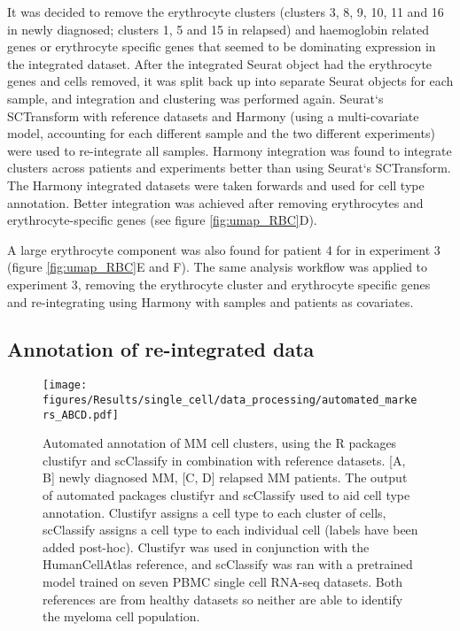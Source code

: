 It was decided to remove the erythrocyte clusters (clusters 3, 8, 9, 10, 11 and 16 in newly diagnosed; clusters 1, 5 and 15 in relapsed) and haemoglobin related genes or erythrocyte specific genes that seemed to be dominating expression in the integrated dataset.
After the integrated Seurat object had the erythrocyte genes and cells removed, it was split back up into separate Seurat objects for each sample, and integration and clustering was performed again.
Seurat`s SCTransform with reference datasets and Harmony (using a multi-covariate model, accounting for each different sample and the two different experiments) were used to re-integrate all samples.
Harmony integration was found to integrate clusters across patients and experiments better than using Seurat`s SCTransform.
The Harmony integrated datasets were taken forwards and used for cell type annotation.
Better integration was achieved after removing erythrocytes and erythrocyte-specific genes (see figure \ref{fig:umap_RBC}D).

A large erythrocyte component was also found for patient 4 for in experiment 3 (figure \ref{fig:umap_RBC}E and F).
The same analysis workflow was applied to experiment 3, removing the erythrocyte cluster and erythrocyte specific genes and re-integrating using Harmony with samples and patients as covariates.



\subsection{Annotation of re-integrated data}


\begin{figure}[htb]
    \centering
    \texttt{[image: figures/Results/single\_cell/data\_processing/automated\_markers\_ABCD.pdf]}
    \caption[Automated annotation of scRNA-seq data]{Automated annotation of MM cell clusters, using the R packages clustifyr and scClassify in combination with reference datasets.
    [A, B] newly diagnosed MM, [C, D] relapsed MM patients.
    The output of automated packages clustifyr and scClassify used to aid cell type annotation.
    Clustifyr assigns a cell type to each cluster of cells, scClassify assigns a cell type to each individual cell (labels have been added post-hoc).
    Clustifyr was used in conjunction with the HumanCellAtlas reference, and scClassify was ran with a pretrained model trained on seven PBMC single cell RNA-seq datasets.
    Both references are from healthy datasets so neither are able to identify the myeloma cell population.}
    \label{fig:annotation_automated}
\end{figure}

